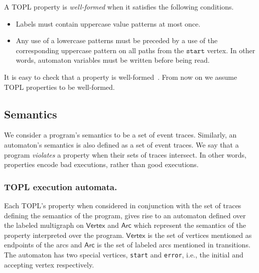 \documentclass{llncs} %
\newcommand{\set}[1]{\ensuremath{\mathsf{#1}}}
\newcommand{\start}{\ensuremath{\mathtt{start}}\xspace}
\begin{document}
A TOPL property is \emph{well-formed} when it satisfies the following conditions.
\begin{itemize}
\item Labels must contain uppercase value patterns at most once.
\item Any use of a lowercase patterns must be preceded by a use of the corresponding uppercase pattern on all paths from the \start vertex.
  In other words, automaton variables must be written before being read.
\end{itemize}
It is easy to check that a property is well-formed~\cite{web:topl.prototype}.
From now on we assume TOPL properties to be well-formed.



\subsection{Semantics}\label{sec:semantics} %

We consider a program's semantics to be a set of event traces.
Similarly, an automaton's semantics is also defined as a set of event traces.
We say that a program \emph{violates} a property when their sets of traces intersect.
In other words, properties encode bad executions, rather than good executions.

\subsubsection{TOPL execution automata.}
\newcommand{\World}{ExecState}

Each TOPL's property when considered in conjunction with the set of traces defining the semantics of the program,
gives rise to an automaton defined over the labeled multigraph  on $\set{Vertex}$ and $\set{Arc}$ which represent the 
semantics of the property interpreted over the program.
$\set{Vertex}$ is the set of vertices mentioned as endpoints of the arcs and $\set{Arc}$ is the set of labeled arcs mentioned in transitions. The automaton has two special vertices, {\tt start} and {\tt error},  i.e., the initial and accepting vertex respectively. 
\end{document}
